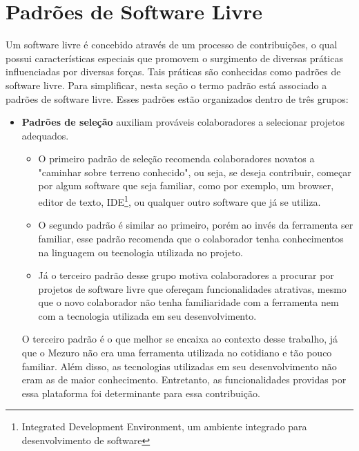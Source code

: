 \section{Padrões de Software Livre}
\label{sec-padroes-sl} 

Um software livre é concebido através de um processo de contribuições, o qual possui características especiais que promovem o surgimento de diversas práticas influenciadas por diversas forças. Tais práticas são conhecidas como padrões de software livre. Para simplificar, nesta seção o termo padrão está associado a padrões de software livre. Esses padrões estão organizados dentro de três grupos:

\begin{itemize}

	\item \textbf{Padrões de seleção} auxiliam prováveis colaboradores a selecionar projetos adequados.

		\begin{itemize}

			\item O primeiro padrão de seleção recomenda colaboradores novatos a "caminhar sobre terreno conhecido", ou seja, se deseja contribuir, começar por algum software que seja familiar, como por exemplo, um browser, editor de texto, IDE\footnote{Integrated Development Environment, um ambiente integrado para desenvolvimento de software}, ou qualquer outro software que já se utiliza.

			\item O segundo padrão é similar ao primeiro, porém ao invés da ferramenta ser familiar, esse padrão recomenda que o colaborador tenha conhecimentos na linguagem ou tecnologia utilizada no projeto.

			\item Já o terceiro padrão desse grupo motiva colaboradores a procurar por projetos de software livre que ofereçam funcionalidades atrativas, mesmo que o novo colaborador não tenha familiaridade com a ferramenta nem com a tecnologia utilizada em seu desenvolvimento.
		\end{itemize}

O terceiro padrão é o que melhor se encaixa ao contexto desse trabalho, já que o Mezuro não era uma ferramenta utilizada no cotidiano e tão pouco familiar. Além disso, as tecnologias utilizadas em seu desenvolvimento não eram as de maior conhecimento. Entretanto, as funcionalidades providas por essa plataforma foi determinante para essa contribuição.


\end{itemize}
